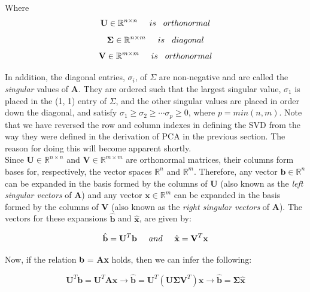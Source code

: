 \documentclass[12pt]{article}
\theoremstyle{plain}
\begin{document}
Where
$$ \textbf{U} \in \mathbb{R}^{n\times n}  \hspace{0.5cm} is \hspace{0.3cm}orthonormal $$
$$ \mathbf{\Sigma} \in \mathbb{R}^{n\times m}  \hspace{0.5cm} is \hspace{0.3cm} diagonal $$
$$ \textbf{V} \in \mathbb{R}^{m\times m}  \hspace{0.5cm} is \hspace{0.3cm} orthonormal $$

In addition, the diagonal entries, $\sigma_i$, of $\Sigma$ are non-negative and are called the \emph{singular} values of \textbf{A}. They are ordered such that the largest singular value, $\sigma_1$ is placed in the (1, 1) entry of $\Sigma$, and the other singular values are placed in order down the diagonal, and satisfy $\sigma_1 \geq \sigma_2 \geq  \cdots \sigma_p \geq 0$, where $p = min(n, m)$. Note that we have reversed the row and column indexes in defining the SVD from the way they were defined in the derivation of PCA in the previous section. The reason for doing this will become apparent shortly.
\\


Since $\textbf{U} \in \mathbb{R}^{n\times n}$ and $\textbf{V} \in \mathbb{R}^{m\times m}$ are orthonormal matrices, their columns form bases for, respectively, the vector spaces $\mathbb{R}^n$ and $\mathbb{R}^m$. Therefore, any vector $\textbf{b} \in \mathbb{R}^n$ can be expanded in the basis formed by the columns of \textbf{U} (also known as the \emph{left singular vectors} of \textbf{A}) and any vector $\textbf{x} \in \mathbb{R}^m$ can be expanded in the basis formed by the columns of \textbf{V} (also known as the \emph{right singular vectors} of \textbf{A}). The vectors for these expansions $\hat{\textbf{b}}$ and $\hat{\textbf{x}}$, are given by:

\begin{equation}
\hat{\textbf{b}} = \textbf{U}^T\textbf{b}  \hspace{0.5cm} and  \hspace{0.5cm} \hat{\textbf{x}} = \textbf{V}^T\textbf{x}
\end{equation}

Now, if the relation \textbf{b} = \textbf{Ax} holds, then we can infer the following:

\begin{equation}
\textbf{U}^T\textbf{b} = \textbf{U}^T\textbf{Ax} \rightarrow \hat{\textbf{b}} = \textbf{U}^T(\textbf{U}\mathbf{\Sigma}\textbf{V}^T)\textbf{x}  \rightarrow \hat{\textbf{b}} = \mathbf{\Sigma}\hat{\textbf{x}}
\end{equation}
\end{document}
